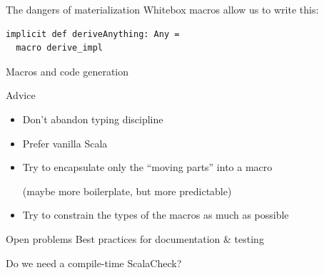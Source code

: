 \documentclass{beamer}
\begin{document}
\begin{frame}[fragile]{The dangers of materialization}
  Whitebox macros allow us to write this:
  \vspace{1em}

  \begin{verbatim}
implicit def deriveAnything: Any =
  macro derive_impl
  \end{verbatim}
\end{frame}

\begin{frame}{Macros and code generation}
  \begin{block}{Advice}
    \begin{itemize}
      \item Don't abandon typing discipline
      \item Prefer vanilla Scala
      \item Try to encapsulate only the ``moving parts'' into a macro

        (maybe more boilerplate, but more predictable)
      \item Try to constrain the types of the macros as much as possible
    \end{itemize}
  \end{block}
  \vspace{1em}

  \begin{block}{Open problems}
    Best practices for documentation \& testing
    \vspace{1em}

    Do we need a compile-time ScalaCheck?
  \end{block}
\end{frame}

\begin{frame}
\vskip40pt
\begin{center}
\end{center}
\end{frame}

\begin{frame}
\vskip40pt
\begin{center}
\end{center}
\end{frame}
\end{document}
